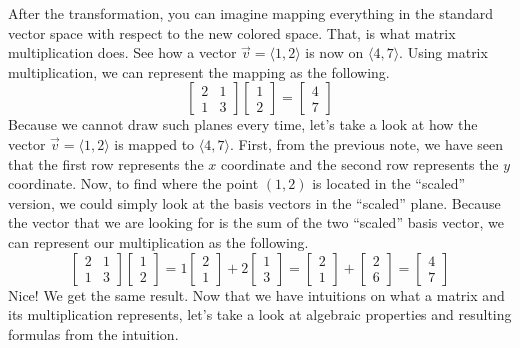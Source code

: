 \documentclass[../../main.tex]{subfiles}
\begin{document}
After the transformation, you can imagine mapping everything
in the standard vector space with respect to the new colored
space. That, is what matrix multiplication does. See how
a vector $\vec{v} = \langle 1, 2 \rangle$ is now on
$\langle 4, 7 \rangle$. Using matrix multiplication, we can
represent the mapping as the following.
\[
\begin{bmatrix}
    2 & 1 \\
    1 & 3
\end{bmatrix}
\begin{bmatrix}
    1 \\
    2
\end{bmatrix}
=
\begin{bmatrix}
    4 \\
    7
\end{bmatrix}
\]
Because we cannot draw such planes every time, let's take a look
at how the vector $\vec{v} = \langle 1, 2 \rangle$ is mapped to
$\langle 4, 7 \rangle$. First, from the previous note, we have seen
that the first row represents the $x$ coordinate and the second
row represents the $y$ coordinate. Now, to find where the point
$(1, 2)$ is located in the ``scaled'' version, we could simply look
at the basis vectors in the ``scaled'' plane. Because the vector
that we are looking for is the sum of the two ``scaled'' basis
vector, we can represent our multiplication as the following.
\[
\begin{bmatrix}
    2 & 1 \\
    1 & 3
\end{bmatrix}
\begin{bmatrix}
    1 \\
    2
\end{bmatrix}
=
1
\begin{bmatrix}
    2 \\
    1
\end{bmatrix}
+
2
\begin{bmatrix}
    1 \\
    3
\end{bmatrix}
=
\begin{bmatrix}
    2 \\
    1
\end{bmatrix}
+
\begin{bmatrix}
    2 \\
    6
\end{bmatrix}
=
\begin{bmatrix}
    4 \\
    7
\end{bmatrix}
\]
Nice! We get the same result. Now that we have intuitions on what
a matrix and its multiplication represents, let's take a look at
algebraic properties and resulting formulas from the intuition.
\end{document}
